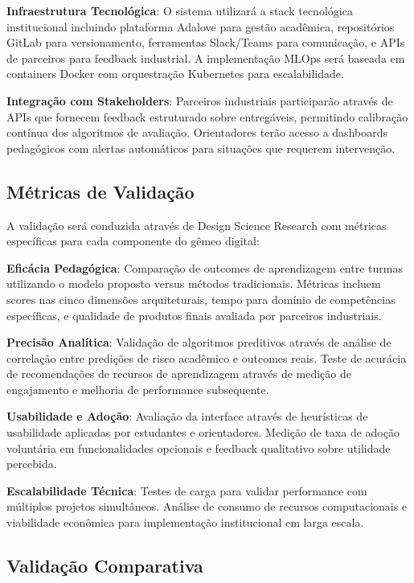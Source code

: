 \documentclass[english, spanish, brazilian]{RBIEarticle} %
\begin{document}
\textbf{Infraestrutura Tecnológica}: O sistema utilizará a stack tecnológica institucional incluindo plataforma Adalove para gestão acadêmica, repositórios GitLab para versionamento, ferramentas Slack/Teams para comunicação, e APIs de parceiros para feedback industrial. A implementação MLOps será baseada em containers Docker com orquestração Kubernetes para escalabilidade.

\textbf{Integração com Stakeholders}: Parceiros industriais participarão através de APIs que fornecem feedback estruturado sobre entregáveis, permitindo calibração contínua dos algoritmos de avaliação. Orientadores terão acesso a dashboards pedagógicos com alertas automáticos para situações que requerem intervenção.

\subsection{Métricas de Validação}

A validação será conduzida através de Design Science Research com métricas
específicas para cada componente do gêmeo digital:

\textbf{Eficácia Pedagógica}: Comparação de outcomes de aprendizagem entre turmas utilizando o modelo proposto versus métodos tradicionais. Métricas incluem scores nas cinco dimensões arquiteturais, tempo para domínio de competências específicas, e qualidade de produtos finais avaliada por parceiros industriais.

\textbf{Precisão Analítica}: Validação de algoritmos preditivos através de análise de correlação entre predições de risco acadêmico e outcomes reais. Teste de acurácia de recomendações de recursos de aprendizagem através de medição de engajamento e melhoria de performance subsequente.

\textbf{Usabilidade e Adoção}: Avaliação da interface através de heurísticas de usabilidade aplicadas por estudantes e orientadores. Medição de taxa de adoção voluntária em funcionalidades opcionais e feedback qualitativo sobre utilidade percebida.

\textbf{Escalabilidade Técnica}: Testes de carga para validar performance com múltiplos projetos simultâneos. Análise de consumo de recursos computacionais e viabilidade econômica para implementação institucional em larga escala.

\subsection{Validação Comparativa}
\end{document}
